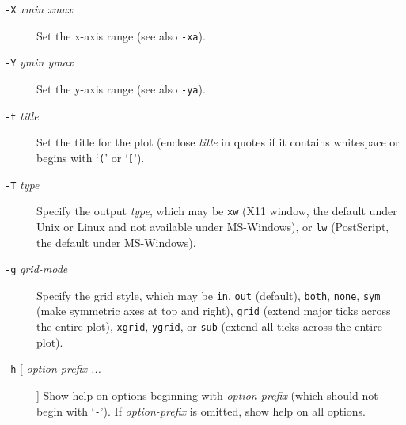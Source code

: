 \begin{description}
\item [\texttt{-X}\textit{ xmin xmax} ] Set the x-axis range (see also \texttt{-xa}). 
\item [\texttt{-Y}\textit{ ymin ymax} ] Set the y-axis
range (see also \texttt{-ya}). 
\item [\texttt{-t}\textit{ title} ] Set the title for the plot (enclose \textit{title} in
quotes if it contains whitespace or begins with `\texttt{(}' or `\texttt{[}'). 
\item [\texttt{-T}\textit{ type} ] Specify
the output \textit{type}, which may be \texttt{xw} (X11 window, the default under Unix or
Linux and not available under MS-Windows), or \texttt{lw} (PostScript, the default
under MS-Windows). 
\item [\texttt{-g}\textit{ grid-mode} ] Specify the grid style, which may be \texttt{in}, \texttt{out}
(default), \texttt{both}, \texttt{none}, \texttt{sym} (make symmetric axes at top and right), \texttt{grid}
(extend major ticks across the entire plot), \texttt{xgrid}, \texttt{ygrid}, or \texttt{sub} (extend
all ticks across the entire plot). 
\item [\texttt{-h} [ \textit{ option-prefix ...} ] ] Show help on options
beginning with \textit{option-prefix} (which should not begin with `\texttt{-}').  If \textit{option-prefix}
is omitted, show help on all options. 
\end{description}


